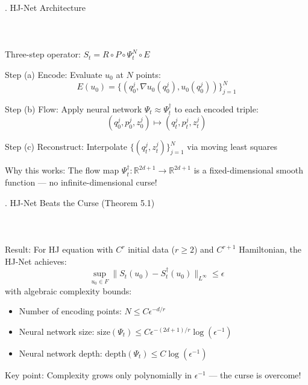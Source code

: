 \documentclass{beamer}
\def\b{\color{blue}}
\def\r{\color{red}}
\begin{document}
\begin{frame}{\thesection. HJ-Net Architecture}
\framesubtitle{$\quad$}
{\Large {\b Three-step operator}: $ S_t = R \circ P \circ \Psi_t^N \circ E $}
\medskip

{\Large {\b Step (a) Encode}: Evaluate $ u_0 $ at $ N $ points:
$$
E(u_0) = \{(q_0^j, \nabla u_0(q_0^j), u_0(q_0^j))\}_{j=1}^N
$$
}

{\Large {\b Step (b) Flow}: Apply neural network $ \Psi_t \approx \Psi_t^\dagger $ to each encoded triple:
$$
(q_0^j, p_0^j, z_0^j) \mapsto (q_t^j, p_t^j, z_t^j)
$$
}

{\Large {\b Step (c) Reconstruct}: Interpolate $ \{(q_t^j, z_t^j)\}_{j=1}^N $ via moving least squares}
\medskip

{\Large {\b Why this works}: The flow map $ \Psi_t^\dagger : \mathbb{R}^{2d+1} \to \mathbb{R}^{2d+1} $ is a {\r fixed-dimensional} smooth function --- no infinite-dimensional curse!}

\end{frame}

\begin{frame}{\thesection. HJ-Net Beats the Curse (Theorem 5.1)}
\framesubtitle{$\quad$}
{\Large {\b Result}: For HJ equation with $ C^r $ initial data ($ r \ge 2 $) and $ C^{r+1} $ Hamiltonian, the HJ-Net achieves:
$$
\sup_{u_0 \in F} \| S_t(u_0) - S_t^\dagger(u_0) \|_{L^\infty} \le \epsilon
$$
with {\b algebraic} complexity bounds:}
\medskip

{\Large 
\begin{itemize}
    \item Number of encoding points: $ N \le C \epsilon^{-d/r} $
    \item Neural network size: $ \text{size}(\Psi_t) \le C \epsilon^{-(2d+1)/r} \log(\epsilon^{-1}) $
    \item Neural network depth: $ \text{depth}(\Psi_t) \le C \log(\epsilon^{-1}) $
\end{itemize}
}
\medskip

{\Large {\b Key point}: Complexity grows only {\b polynomially} in $ \epsilon^{-1} $ --- the curse is overcome!}

\end{frame}
\end{document}
